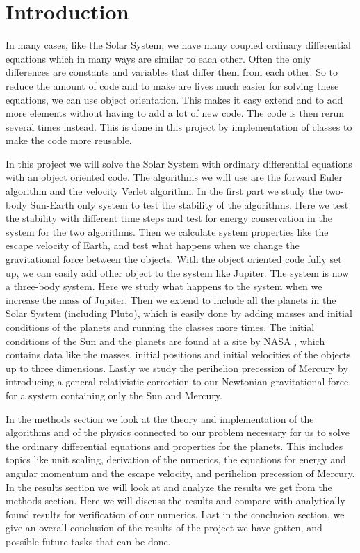 \documentclass[12pt,a4paper,english]{article}
\begin{document}
\section{Introduction}
\label{sect:Introduction}
In many cases, like the Solar System, we have many coupled ordinary differential equations which in many ways are similar to each other. Often the only differences are constants and variables that differ them from each other. So to reduce the amount of code and to make are lives much easier for solving these equations, we can use object orientation. This makes it easy extend and to add more elements without having to add a lot of new code. The code is then rerun several times instead. This is done in this project by implementation of classes to make the code more reusable.

In this project we will solve the Solar System with ordinary differential equations with an object oriented code. The algorithms we will use are the forward Euler algorithm and the velocity Verlet algorithm. In the first part we study the two-body Sun-Earth only system to test the stability of the algorithms. Here we test the stability with different time steps and test for energy conservation in the system for the two algorithms. Then we calculate system properties like the escape velocity of Earth, and test what happens when we change the gravitational force between the objects. With the object oriented code fully set up, we can easily add other object to the system like Jupiter. The system is now a three-body system. Here we study what happens to the system when we increase the mass of Jupiter. Then we extend to include all the planets in the Solar System (including Pluto), which is easily done by adding masses and initial conditions of the planets and running the classes more times. The initial conditions of the Sun and the planets are found at a site by NASA \cite{horizon}, which contains data like the masses, initial positions and initial velocities of the objects up to three dimensions. Lastly we study the perihelion precession of Mercury by introducing a general relativistic correction to our Newtonian gravitational force, for a system containing only the Sun and Mercury.

In the methods section we look at the theory and implementation of the algorithms and of the physics connected to our problem necessary for us to solve the ordinary differential equations and properties for the planets. This includes topics like unit scaling, derivation of the numerics, the equations for energy and angular momentum and the escape velocity, and perihelion precession of Mercury. In the results section we will look at and analyze the results we get from the methods section. Here we will discuss the results and compare with analytically found results for verification of our numerics. Last in the conclusion section, we give an overall conclusion of the results of the project we have gotten, and possible future tasks that can be done.
\end{document}
